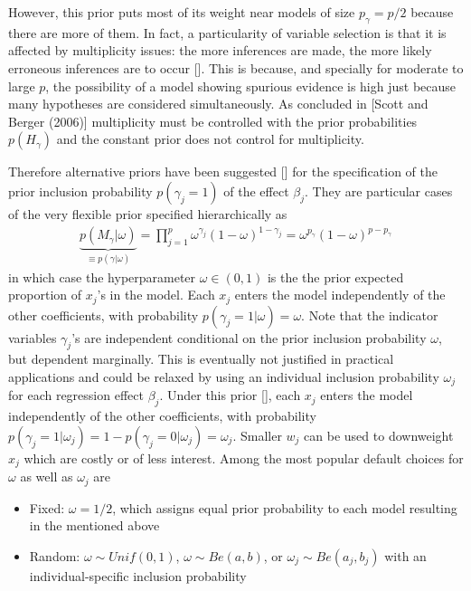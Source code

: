 \documentclass[11 pt]{article}
\begin{document}
\begin{multicols}{2}
However, this prior puts most of its weight near models of size $p_\gamma = p/2$ because there are more of them. In fact, a particularity of variable selection is that it is affected by multiplicity issues: the more inferences are made, the more likely erroneous inferences are to occur  [\cite{Bayarri2012}]. This is because, and specially for moderate to large $p$, the possibility of a model showing spurious evidence is high just because many hypotheses are considered simultaneously. As concluded in [Scott and Berger (2006)] multiplicity must be controlled with the prior probabilities $p(H_\gamma)$ and the constant prior does not control for multiplicity.

Therefore alternative priors have been suggested [\cite{Practical2001}] for the specification of the prior inclusion probability $p(\gamma_j= 1)$ of the effect $\beta_j$. They are particular cases of the very flexible prior specified hierarchically as
\begin{align*}
   \underbrace{p(M_\gamma|\omega)}_{\equiv p(\gamma|\omega)} =  \prod_{j=1}^p \omega^{\gamma_j}(1-\omega)^{1-\gamma_j} =  \omega^{p_\gamma}(1-\omega)^{p-p_\gamma} 
\end{align*}
in which case the hyperparameter $\omega \in (0,1)$ is the the prior expected proportion of $x_j$'s in the model. Each $x_j$ enters the model independently of the other coefficients, with probability $p(\gamma_j = 1|\omega) = \omega$.
Note that the indicator variables $\gamma_j$'s are independent conditional on the prior inclusion probability $\omega$, but dependent marginally. This is eventually not justified in practical applications and could be relaxed by using an individual inclusion probability $\omega_j$ for each regression effect $\beta_j$.
Under this prior [\cite{George1993}], each $x_j$ enters the model independently of the other coefficients, with probability $p(\gamma_j = 1|\omega_j) = 1 - p(\gamma_j = 0|\omega_j) = \omega_j$. Smaller $w_j$ can be used to downweight $x_j$ which are costly or of less interest. Among the most popular default choices for $\omega$ as well as $\omega_j$ are
\begin{itemize}
    \item Fixed: $\omega = 1/2$, which assigns equal prior probability to each model resulting in the  mentioned above
    \item Random: $\omega \sim Unif(0, 1)$, $\omega\sim Be(a,b)$, or $\omega_j \sim Be(a_j,b_j)$ with an individual-specific inclusion probability 
\end{itemize}


\end{multicols}
\end{document}
